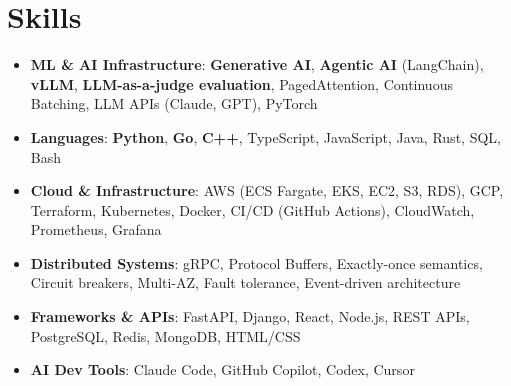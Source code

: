 \documentclass[letterpaper,11pt]{article}
\newcommand{\resumeSubHeadingListStart}{\begin{itemize}[leftmargin=0.15in, label={}]}
\newcommand{\resumeSubHeadingListEnd}{\end{itemize}}
\newcommand{\resumeSkillHeading}[2]{%
  \item\small{\textbf{#1}: #2 \vspace{-9pt}}%
}
\begin{document}
\section{Skills}
  \resumeSubHeadingListStart
    \resumeSkillHeading{ML \& AI Infrastructure}{\textbf{Generative AI}, \textbf{Agentic AI} (LangChain), \textbf{vLLM}, \textbf{LLM-as-a-judge evaluation}, PagedAttention, Continuous Batching, LLM APIs (Claude, GPT), PyTorch}
    \resumeSkillHeading{Languages}{\textbf{Python}, \textbf{Go}, \textbf{C++}, TypeScript, JavaScript, Java, Rust, SQL, Bash}
    \resumeSkillHeading{Cloud \& Infrastructure}{AWS (ECS Fargate, EKS, EC2, S3, RDS), GCP, Terraform, Kubernetes, Docker, CI/CD (GitHub Actions), CloudWatch, Prometheus, Grafana}
    \resumeSkillHeading{Distributed Systems}{gRPC, Protocol Buffers, Exactly-once semantics, Circuit breakers, Multi-AZ, Fault tolerance, Event-driven architecture}
    \resumeSkillHeading{Frameworks \& APIs}{FastAPI, Django, React, Node.js, REST APIs, PostgreSQL, Redis, MongoDB, HTML/CSS}
    \resumeSkillHeading{AI Dev Tools}{Claude Code, GitHub Copilot, Codex, Cursor}
  \resumeSubHeadingListEnd
\end{document}
